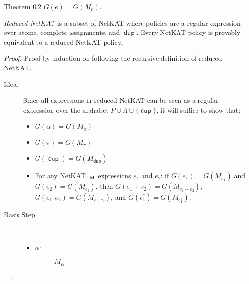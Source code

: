 \documentclass{article}
\newcommand\pdup{\mathop{\mathsf{dup}}}
\renewcommand\star{^{\textstyle *}}
\begin{document}
\begin{namedtheorem}{Theorem 0.2}
$G(e) = G(M_e)$.
\end{namedtheorem}

\begin{definition}
{\it Reduced NetKAT} is a subset of NetKAT where policies are a regular 
expression over atoms, complete assignments, and $\pdup$. Every NetKAT policy 
is provably equivalent to a reduced NetKAT policy.
\end{definition}

\begin{proof} Proof by induction on following the recursive definition of 
reduced NetKAT.

\begin{description}

\item[Idea.] Since all expressions in reduced NetKAT can be seen as a regular 
expression over the alphabet $P \cup A \cup \{\pdup\}$, it will suffice to show
that:
\begin{itemize}
  \item $G(\alpha) = G(M_\alpha)$
  \item $G(\pi) = G(M_\pi)$
  \item $G(\pdup) = G(M_{\pdup})$
  \item For any NetKAT$_{\textnormal{DM}}$ expressions $e_1$ and $e_2$: if
  $G(e_1) = G(M_{e_1})$ and $G(e_2) = G(M_{e_2})$, then 
  $G(e_1+e_2) = G(M_{e_1+e_2})$, $G(e_1;e_2) = G(M_{e_1;e_2})$, and
  $G(e_1\star) = G(M_{e_1\star})$.
\end{itemize}
   
  
\item[Basis Step.]
\mbox{ }
  
\begin{itemize}
  \item $\alpha$:
  \begin{figure}[H]
    \centering
    \caption{$M_{\alpha}$}
  \end{figure}
  

\end{itemize}
\end{description}
\end{proof}
\end{document}
